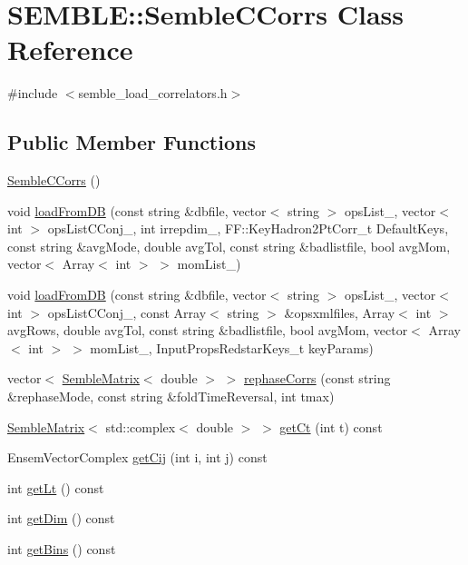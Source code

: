 \hypertarget{classSEMBLE_1_1SembleCCorrs}{}\section{S\+E\+M\+B\+LE\+:\+:Semble\+C\+Corrs Class Reference}
\label{classSEMBLE_1_1SembleCCorrs}


{\ttfamily \#include $<$semble\+\_\+load\+\_\+correlators.\+h$>$}

\subsection*{Public Member Functions}
\begin{DoxyCompactItemize}
\item 
\mbox{\hyperlink{classSEMBLE_1_1SembleCCorrs_a16a87863192b0b8933203122230e672e}{Semble\+C\+Corrs}} ()
\item 
void \mbox{\hyperlink{classSEMBLE_1_1SembleCCorrs_aff77b082f126bb4094553ca6e9309985}{load\+From\+DB}} (const string \&dbfile, vector$<$ string $>$ ops\+List\+\_\+, vector$<$ int $>$ ops\+List\+C\+Conj\+\_\+, int irrepdim\+\_\+, F\+F\+::\+Key\+Hadron2\+Pt\+Corr\+\_\+t Default\+Keys, const string \&avg\+Mode, double avg\+Tol, const string \&badlistfile, bool avg\+Mom, vector$<$ Array$<$ int $>$ $>$ mom\+List\+\_\+)
\item 
void \mbox{\hyperlink{classSEMBLE_1_1SembleCCorrs_a9fa9fdd587137bb3434f8d9c329c6561}{load\+From\+DB}} (const string \&dbfile, vector$<$ string $>$ ops\+List\+\_\+, vector$<$ int $>$ ops\+List\+C\+Conj\+\_\+, const Array$<$ string $>$ \&opsxmlfiles, Array$<$ int $>$ avg\+Rows, double avg\+Tol, const string \&badlistfile, bool avg\+Mom, vector$<$ Array$<$ int $>$ $>$ mom\+List\+\_\+, Input\+Props\+Redstar\+Keys\+\_\+t key\+Params)
\item 
vector$<$ \mbox{\hyperlink{structSEMBLE_1_1SembleMatrix}{Semble\+Matrix}}$<$ double $>$ $>$ \mbox{\hyperlink{classSEMBLE_1_1SembleCCorrs_a8a6ab4bd80f866d566c8a62ec53d5a53}{rephase\+Corrs}} (const string \&rephase\+Mode, const string \&fold\+Time\+Reversal, int tmax)
\item 
\mbox{\hyperlink{structSEMBLE_1_1SembleMatrix}{Semble\+Matrix}}$<$ std\+::complex$<$ double $>$ $>$ \mbox{\hyperlink{classSEMBLE_1_1SembleCCorrs_a800db1b6b985a3064c3adc0fa85aac0b}{get\+Ct}} (int t) const
\item 
Ensem\+Vector\+Complex \mbox{\hyperlink{classSEMBLE_1_1SembleCCorrs_a822cf18e7c93c9fb037d5823aacbd11c}{get\+Cij}} (int i, int j) const
\item 
int \mbox{\hyperlink{classSEMBLE_1_1SembleCCorrs_aac492c18afa3475a688db0ffa4d27ff6}{get\+Lt}} () const
\item 
int \mbox{\hyperlink{classSEMBLE_1_1SembleCCorrs_ac3f37c3af38d763addbec0cdb86d6117}{get\+Dim}} () const
\item 
int \mbox{\hyperlink{classSEMBLE_1_1SembleCCorrs_aca4e53b5dfff91c60c3072d39e516a33}{get\+Bins}} () const
\end{DoxyCompactItemize}


